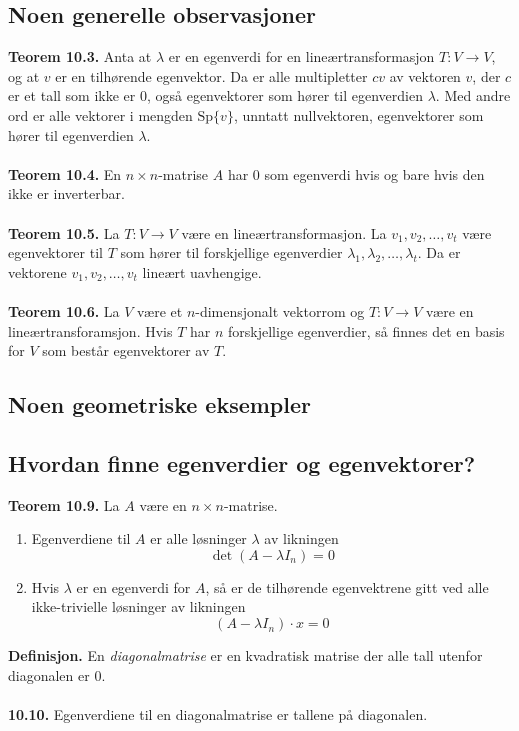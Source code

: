 \documentclass{article}
\begin{document}
\subsection{Noen generelle observasjoner}
\textbf{Teorem 10.3.} Anta at $\lambda$ er en egenverdi for en lineærtransformasjon $T: V \rightarrow V$, og at $v$ er en tilhørende egenvektor. Da er alle multipletter $cv$ av vektoren $v$, der $c$ er et tall som ikke er $0$, også egenvektorer som hører til egenverdien $\lambda$. Med andre ord er alle vektorer i mengden $\text{Sp}\{v\}$, unntatt nullvektoren, egenvektorer som hører til egenverdien $\lambda$.
\\\\
\textbf{Teorem 10.4.} En $n \times n$-matrise $A$ har $0$ som egenverdi hvis og bare hvis den ikke er inverterbar.
\\\\
\textbf{Teorem 10.5.} La $T: V \rightarrow V$ være en lineærtransformasjon. La $v_1, v_2, \dots, v_t$ være egenvektorer til $T$ som hører til forskjellige egenverdier $\lambda_1, \lambda_2, \dots, \lambda_t$. Da er vektorene $v_1, v_2, \dots, v_t$ lineært uavhengige.
\\\\
\textbf{Teorem 10.6.} La $V$ være et $n$-dimensjonalt vektorrom og $T: V \rightarrow V$ være en lineærtransforamsjon. Hvis $T$ har $n$ forskjellige egenverdier, så finnes det en basis for $V$ som består egenvektorer av $T$.


\subsection{Noen geometriske eksempler}


\subsection{Hvordan finne egenverdier og egenvektorer?}
\textbf{Teorem 10.9.} La $A$ være en $n \times n$-matrise.
\begin{enumerate}
    \item Egenverdiene til $A$ er alle løsninger $\lambda$ av likningen
    \[ \det{(A - \lambda I_n)} = 0 \]
    \item Hvis $\lambda$ er en egenverdi for $A$, så er de tilhørende egenvektrene gitt ved alle ikke-trivielle løsninger av likningen
    \[ (A - \lambda I_n ) \cdot x = 0 \]
\end{enumerate} 
\textbf{Definisjon.} En \textit{diagonalmatrise} er en kvadratisk matrise der alle tall utenfor diagonalen er $0$.
\\\\
\textbf{10.10.} Egenverdiene til en diagonalmatrise er tallene på diagonalen.
\end{document}
